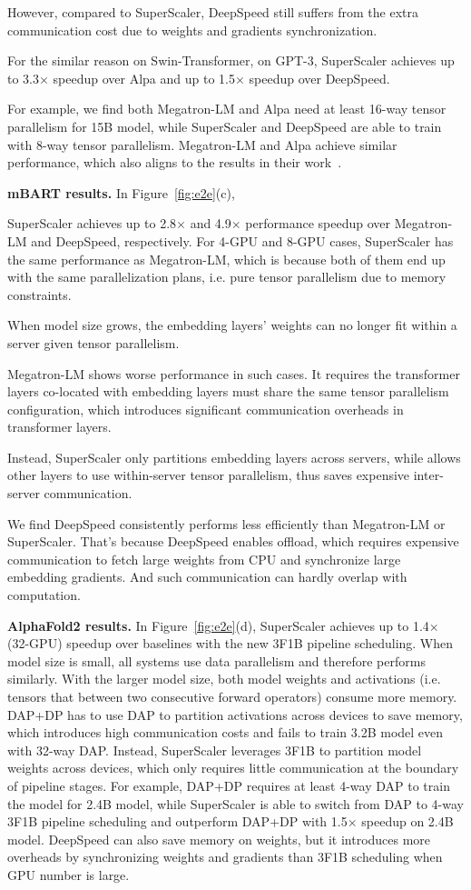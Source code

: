 However, compared to {SuperScaler}, DeepSpeed still suffers from the extra communication cost due to weights and gradients synchronization.

For the similar reason on Swin-Transformer, on GPT-3, {SuperScaler} achieves up to 3.3$\times$ speedup over Alpa and up to 1.5$\times$ speedup over DeepSpeed. 

For example, we find both Megatron-LM and Alpa need at least 16-way tensor parallelism for 15B model, while {SuperScaler} and DeepSpeed are able to train with 8-way tensor parallelism. Megatron-LM and Alpa achieve similar performance, which also aligns to the results in their work~\cite{alpa}.

{\bf  mBART results. } In Figure~\ref{fig:e2e}(c), 

{SuperScaler} achieves up to 2.8$\times$ and 4.9$\times$ performance speedup over Megatron-LM and DeepSpeed, respectively. For 4-GPU and 8-GPU cases, {SuperScaler} has the same performance as Megatron-LM, which is because both of them end up with the same parallelization plans, i.e. pure tensor parallelism due to memory constraints. 

When model size grows, the embedding layers' weights can no longer fit within a server given tensor parallelism.

Megatron-LM shows worse performance in such cases. It requires the transformer layers co-located with embedding layers must share the same tensor parallelism configuration, which introduces significant communication overheads in transformer layers.

Instead, {SuperScaler} only partitions embedding layers across servers, while allows other layers to use within-server tensor parallelism, thus saves expensive inter-server communication.

We find DeepSpeed consistently performs less efficiently than Megatron-LM or {SuperScaler}. That's because DeepSpeed enables offload, which requires expensive communication to fetch large weights from CPU and synchronize large embedding gradients. And such communication can hardly overlap with computation.

{\bf  AlphaFold2 results. } In Figure~\ref{fig:e2e}(d),  
{SuperScaler} achieves up to 1.4$\times$ (32-GPU) speedup over baselines with the new 3F1B pipeline scheduling. When model size is small, all systems use data parallelism and therefore performs similarly. With the larger model size, both model weights and activations (i.e. tensors that between two consecutive forward operators) consume more memory. DAP+DP has to use DAP to partition activations across devices to save memory, which introduces high communication costs and fails to train 3.2B model even with 32-way DAP. Instead, {SuperScaler} leverages 3F1B to partition model weights across devices, which only requires little communication at the boundary of pipeline stages. For example, DAP+DP requires at least 4-way DAP to train the model for 2.4B model, while {SuperScaler} is able to switch from DAP to 4-way 3F1B pipeline scheduling and outperform DAP+DP with 1.5$\times$ speedup on 2.4B model. DeepSpeed can also save memory on weights, but it introduces more overheads by synchronizing weights and gradients than 3F1B scheduling when GPU number is large.

